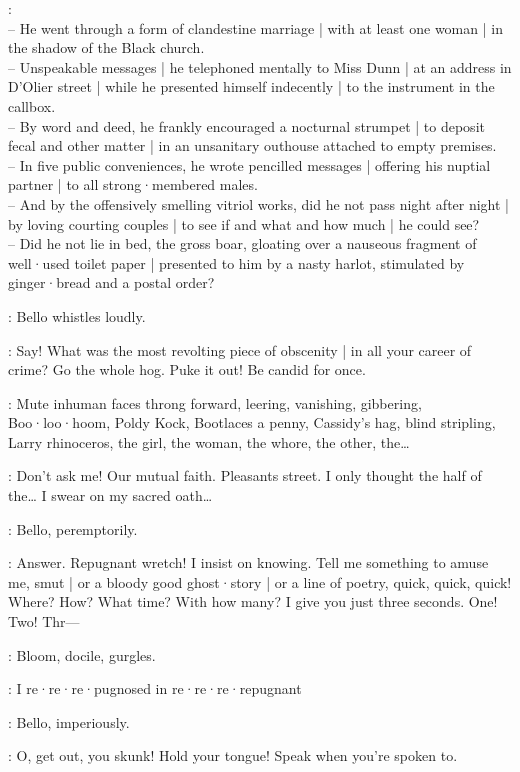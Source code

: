 \SinsPast:\\
-- He went through a form of clandestine marriage |
with at least one woman |
in the shadow of the Black church.\\
-- Unspeakable messages |
he telephoned mentally to Miss Dunn |
%
at an address in D'Olier street |
while he presented himself indecently |
to the instrument in the callbox.\\
-- By word and deed,
he frankly encouraged a nocturnal strumpet |
to deposit fecal and other matter |
in an unsanitary outhouse attached to empty premises.\\
-- In five public conveniences,
he wrote pencilled messages |
offering his nuptial partner |
to all strong·membered males.\\
-- And by the offensively smelling vitriol works,
did he not pass night after night |
by loving courting couples |
to see if and what and how much |
he could see?\\
-- Did he not lie in bed,
the gross boar,
gloating over a nauseous fragment of well·used toilet paper |
presented to him by a nasty harlot,
stimulated by ginger·bread and a postal order?%

:
Bello whistles loudly.

\Bello:
Say!
What was the most revolting piece of obscenity |
in all your career of crime?
Go the whole hog.
Puke it out!
Be candid for once.

:
Mute inhuman faces throng forward,
leering,
vanishing,
gibbering,
Boo·loo·hoom,
Poldy Kock,
Bootlaces a penny,
Cassidy's hag,
blind stripling,
Larry rhinoceros,
the girl,
the woman,
the whore,
the other,
the…

\Bloom:
Don't ask me!
Our mutual faith.
Pleasants street.
I only thought the half of the…
I swear on my sacred oath…%

:
Bello,
peremptorily.

\Bello:
Answer.
Repugnant wretch!
I insist on knowing.
Tell me something to amuse me,
smut |
or a bloody good ghost·story |
or a line of poetry,
quick,
quick,
quick!
Where?
How?
What time?
With how many?
I give you just three seconds.
One!
Two!
Thr---

:
Bloom,
docile,
gurgles.

\Bloom:
I re·re·re·pugnosed in re·re·re·repugnant

:
Bello,
imperiously.

\Bello:
O,
get out,
you skunk!
Hold your tongue!
Speak when you're spoken to.%

